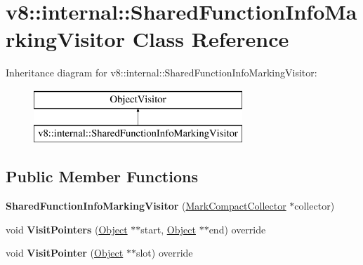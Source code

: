 \hypertarget{classv8_1_1internal_1_1_shared_function_info_marking_visitor}{}\section{v8\+:\+:internal\+:\+:Shared\+Function\+Info\+Marking\+Visitor Class Reference}
\label{classv8_1_1internal_1_1_shared_function_info_marking_visitor}
Inheritance diagram for v8\+:\+:internal\+:\+:Shared\+Function\+Info\+Marking\+Visitor\+:\begin{figure}[H]
\begin{center}
\leavevmode
\includegraphics[height=2.000000cm]{classv8_1_1internal_1_1_shared_function_info_marking_visitor}
\end{center}
\end{figure}
\subsection*{Public Member Functions}
\begin{DoxyCompactItemize}
\item 
{\bfseries Shared\+Function\+Info\+Marking\+Visitor} (\hyperlink{classv8_1_1internal_1_1_mark_compact_collector}{Mark\+Compact\+Collector} $\ast$collector)\hypertarget{classv8_1_1internal_1_1_shared_function_info_marking_visitor_aae4a724c2490d4bd0aa0078f169e65f1}{}\label{classv8_1_1internal_1_1_shared_function_info_marking_visitor_aae4a724c2490d4bd0aa0078f169e65f1}

\item 
void {\bfseries Visit\+Pointers} (\hyperlink{classv8_1_1internal_1_1_object}{Object} $\ast$$\ast$start, \hyperlink{classv8_1_1internal_1_1_object}{Object} $\ast$$\ast$end) override\hypertarget{classv8_1_1internal_1_1_shared_function_info_marking_visitor_aeeb3c0caf5481e830282f22d574d2b2e}{}\label{classv8_1_1internal_1_1_shared_function_info_marking_visitor_aeeb3c0caf5481e830282f22d574d2b2e}

\item 
void {\bfseries Visit\+Pointer} (\hyperlink{classv8_1_1internal_1_1_object}{Object} $\ast$$\ast$slot) override\hypertarget{classv8_1_1internal_1_1_shared_function_info_marking_visitor_ad4573d4e209881fa8385275c1ac58e86}{}\label{classv8_1_1internal_1_1_shared_function_info_marking_visitor_ad4573d4e209881fa8385275c1ac58e86}

\end{DoxyCompactItemize}
